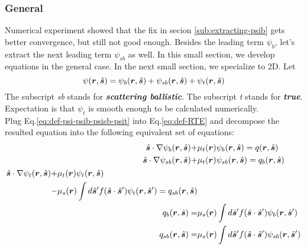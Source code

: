 \documentclass [10pt,letterpaper]{article}
\newcommand{\unitvectorsym}[1]{\hat{\vectorsym{#1}}}
\newcommand{\grad}{\nabla}
\begin{document}
\subsubsection{General}
\label{subsub:extracting-psib-psisb-general}
Numerical experiment showed that the fix in secion \ref{sub:extracting-psib} gets better convergence, but still not good enough.
Besides the leading term $\psi_b$, let's extract the next leading term $\psi_{sb}$ as well.
In this small section, we develop equations in the general case.
In the next small section, we specialize to 2D.
Let
\begin{equation} \label{eq:def-psi-psib-psisb-psit} 
	\psi(\vectorsym{r},\unitvectorsym{s})
	= 
	\psi_b(\vectorsym{r},\unitvectorsym{s})
	+
	\psi_{sb}(\vectorsym{r},\unitvectorsym{s})
	+
	\psi_t(\vectorsym{r},\unitvectorsym{s})
\end{equation}
The subscript \emph{sb} stands for \emph{\bf scattering ballistic}.
The subscript \emph{t} stands for \emph{\bf true}.
Expectation is that $\psi_t$ is smooth enough to be calculated numerically.
\\
Plug Eq.\eqref{eq:def-psi-psib-psisb-psit} into Eq.\eqref{eq:def-RTE} and decompose the resulted equation into the following equivalent set of equations:
\begin{subequations} \label{eq:def-psi-2ndtime-psisb-psit-general-qb-2ndtime-qsb-general}
	\begin{align}
		\unitvectorsym{s} \cdot \grad
		\psi_b(\vectorsym{r},\unitvectorsym{s})
		+&
		\mu_t(\vectorsym{r})
		\psi_b(\vectorsym{r},\unitvectorsym{s})
		=
		q(\vectorsym{r},\unitvectorsym{s}) 
		\label{eq:def-psib-general-2ndtime}
		\\ 
		\unitvectorsym{s} \cdot \grad
		\psi_{sb}(\vectorsym{r},\unitvectorsym{s})
		+&
		\mu_t(\vectorsym{r})
		\psi_{sb}(\vectorsym{r},\unitvectorsym{s})
		=
		q_b(\vectorsym{r},\unitvectorsym{s}) 
		\label{eq:def-psisb-general}
		\\
		\begin{split}
			\unitvectorsym{s} \cdot \grad
			\psi_t(\vectorsym{r},\unitvectorsym{s})
			+&
			\mu_t(\vectorsym{r})
			\psi_t(\vectorsym{r},\unitvectorsym{s})
			\\
			-&
			\mu_s(\vectorsym{r})
			\int d\unitvectorsym{s}^\prime
			f(\unitvectorsym{s} \cdot \unitvectorsym{s}^\prime)
			\psi_t(\vectorsym{r},\unitvectorsym{s}^\prime)
			=
			q_{sb}(\vectorsym{r},\unitvectorsym{s}) 
		\end{split}
		\label{eq:def-psit-general} 
		\\
		q_b(\vectorsym{r},\unitvectorsym{s})
		=&
		\mu_s(\vectorsym{r})
		\int d\unitvectorsym{s}^\prime
		f(\unitvectorsym{s} \cdot \unitvectorsym{s}^\prime)
		\psi_b(\vectorsym{r},\unitvectorsym{s}^\prime)
		\label{eq:def-qb-general-2ndtime}
		\\ 
		q_{sb}(\vectorsym{r},\unitvectorsym{s})
		=&
		\mu_s(\vectorsym{r})
		\int d\unitvectorsym{s}^\prime
		f(\unitvectorsym{s} \cdot \unitvectorsym{s}^\prime)
		\psi_{sb}(\vectorsym{r},\unitvectorsym{s}^\prime)
		\label{eq:def-qsb-general}
	\end{align}
\end{subequations}
\end{document}
